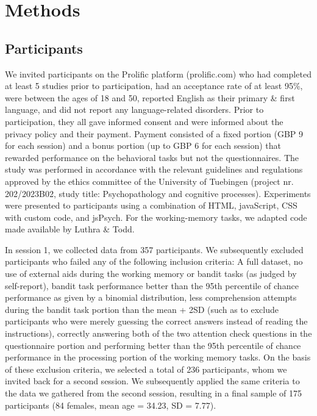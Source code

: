 \documentclass[fleqn,10pt]{wlscirep}
\begin{document}
\section*{Methods}
\subsection*{Participants}
We invited participants on the Prolific platform (prolific.com) who had completed at least 5 studies prior to participation, had an acceptance rate of at least 95\%, were between the ages of 18 and 50, reported English as their primary \& first language, and did not report any language-related disorders. Prior to participation, they all gave informed consent and were informed about the privacy policy and their payment. Payment consisted of a fixed portion (GBP 9 for each session) and a bonus portion (up to GBP 6 for each session) that rewarded performance on the behavioral tasks but not the questionnaires. The study was performed in accordance with the relevant guidelines and regulations approved by the ethics committee of the University of Tuebingen (project nr. 202/2023B02, study title: Psychopathology and cognitive processes). Experiments were presented to participants using a combination of HTML, javaScript, CSS with custom code, and jsPsych\cite{de_leeuw_jspsych_2015}. For the working-memory tasks, we adapted code made available by Luthra \& Todd\cite{luthra_role_2019}. 

In session 1, we collected data from 357 participants. We subsequently excluded participants who failed any of the following inclusion criteria: A full dataset, no use of external aids during the working memory or bandit tasks (as judged by self-report),  bandit task performance better than the 95th percentile of chance performance as given by a binomial distribution, less comprehension attempts during the bandit task portion than the mean + 2SD (such as to exclude participants who were merely guessing the correct answers instead of reading the instructions), correctly answering both of the two attention check questions in the questionnaire portion and performing better than the 95th percentile of chance performance in the processing portion of the working memory tasks. 
On the basis of these exclusion criteria, we selected a total of 236 participants, whom we invited back for a second session. We subsequently applied the same criteria to the data we gathered from the second session, resulting in a final sample of 175 participants (84 females, mean age = 34.23, SD = 7.77).
\end{document}
